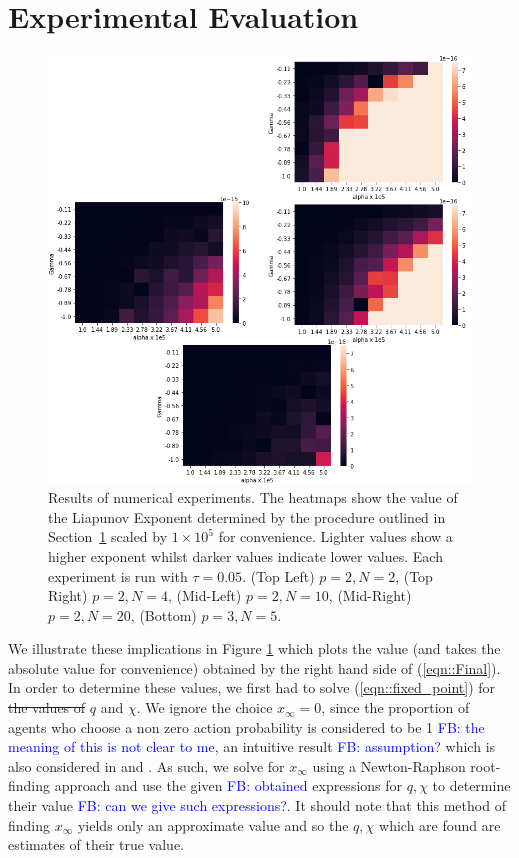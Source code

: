 \documentclass[sigconf,anonymous]{aamas}
\newcommand{\xfixed}{x_\infty}
\newcommand\fb[1]{\textcolor{blue}{FB: #1}}
\begin{document}

\section{Experimental Evaluation} \label{sec:exev}

\begin{figure}
    \centering
    \includegraphics[width = 1.1 \linewidth]{Figures/Theory.png}
    \caption{Results of numerical experiments. The heatmaps show the value of the Liapunov Exponent determined by the procedure outlined in Section~\ref{sec:exev} scaled by $1 \times 10^5$ for convenience. Lighter values show a higher exponent whilst darker values indicate lower values. Each experiment is run with $\tau = 0.05$. (Top Left) $p = 2, N = 2$, (Top Right) $p = 2, N = 4$, (Mid-Left) $p = 2, N = 10$, (Mid-Right) $p = 2, N = 20$, (Bottom) $p = 3, N = 5$.}
    \label{fig:theory}
\end{figure}

We illustrate these implications in Figure \ref{fig:theory} which plots the value (and takes the absolute value for convenience) obtained by the right hand side of (\ref{eqn::Final}). In order to determine these values, we first had to solve (\ref{eqn::fixed_point}) for \st{the values of} $q$ and $\chi$. We ignore the choice $\xfixed  = 0$, since the proportion of agents who choose a non zero action probability is considered to be 1 \fb{the meaning of this is not clear to me}, an intuitive result \fb{assumption?} which is also considered in \cite{Sanders2018} and \cite{Coolen2005}. As such, we solve for $\xfixed$ using a Newton-Raphson root-finding approach and use the given \fb{obtained} expressions for $q, \chi$ to determine their value \fb{can we give such expressions?}. It should note that this method of finding $\xfixed$ yields only an approximate value and so the $q, \chi$ which are found are estimates of their true value. 
\end{document}
